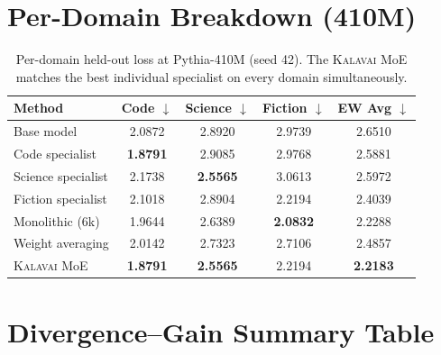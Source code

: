 \documentclass{article}
\newcommand{\kalavai}{\textsc{Kalavai}\xspace}
\begin{document}
\section{Per-Domain Breakdown (410M)}
\label{app:perdomain}

\begin{table}[h]
\centering
\caption{Per-domain held-out loss at Pythia-410M (seed 42). The \kalavai MoE matches the best individual specialist on every domain simultaneously.}
\label{tab:perdomain}
\small
\begin{tabular}{lcccc}
\toprule
\textbf{Method} & \textbf{Code} $\downarrow$ & \textbf{Science} $\downarrow$ & \textbf{Fiction} $\downarrow$ & \textbf{EW Avg} $\downarrow$ \\
\midrule
Base model          & 2.0872 & 2.8920 & 2.9739 & 2.6510 \\
Code specialist     & \textbf{1.8791} & 2.9085 & 2.9768 & 2.5881 \\
Science specialist  & 2.1738 & \textbf{2.5565} & 3.0613 & 2.5972 \\
Fiction specialist  & 2.1018 & 2.8904 & 2.2194 & 2.4039 \\
\midrule
Monolithic (6k)     & 1.9644 & 2.6389 & \textbf{2.0832} & 2.2288 \\
Weight averaging    & 2.0142 & 2.7323 & 2.7106 & 2.4857 \\
\kalavai MoE        & \textbf{1.8791} & \textbf{2.5565} & 2.2194 & \textbf{2.2183} \\
\bottomrule
\end{tabular}
\end{table}

\section{Divergence--Gain Summary Table}
\label{app:divgain_table}
\end{document}
